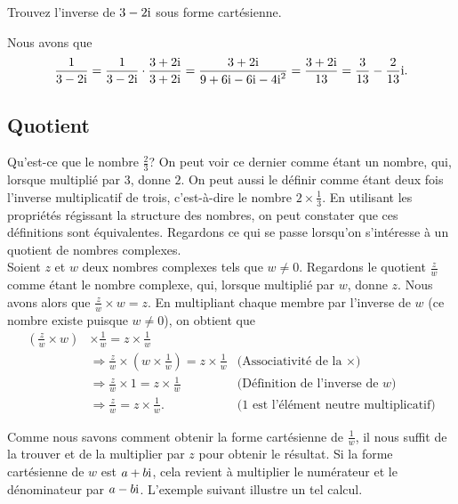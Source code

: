 \documentclass[
  letterpaper,
  DIV=11,
  numbers=noendperiod,
  oneside]{scrreprt}
\theoremstyle{definition}
\theoremstyle{remark}
\begin{document}
\begin{tcolorbox}[enhanced jigsaw, titlerule=0mm, colback=white, leftrule=.75mm, colframe=quarto-callout-note-color-frame, left=2mm, opacityback=0, toprule=.15mm, bottomrule=.15mm, breakable, title={Exemple}, coltitle=black, rightrule=.15mm, opacitybacktitle=0.6, bottomtitle=1mm, toptitle=1mm, arc=.35mm, colbacktitle=quarto-callout-note-color!10!white]

Trouvez l'inverse de \(3-2\textrm{i}\) sous forme cartésienne.

Nous avons que
\[\frac{1}{3-2\textrm{i}}=\frac{1}{3-2\textrm{i}}\cdot\frac{3+2\textrm{i}}{3+2\textrm{i}}=\frac{3+2\textrm{i}}{9+6\textrm{i}-6\textrm{i}-4\textrm{i}^2}=\frac{3+2\textrm{i}}{13}=\frac{3}{13}-\frac{2}{13}\textrm{i}.\]

\end{tcolorbox}

\hypertarget{quotient}{%
\subsection{Quotient}\label{quotient}}

Qu'est-ce que le nombre \(\frac{2}{3}\)? On peut voir ce dernier comme
étant un nombre, qui, lorsque multiplié par \(3\), donne \(2\). On peut
aussi le définir comme étant deux fois l'inverse multiplicatif de trois,
c'est-à-dire le nombre \(2\times \frac{1}{3}\). En utilisant les
propriétés régissant la structure des nombres, on peut constater que ces
définitions sont équivalentes. Regardons ce qui se passe lorsqu'on
s'intéresse à un quotient de nombres complexes.\\
Soient \(z\) et \(w\) deux nombres complexes tels que \(w\neq 0\).
Regardons le quotient \(\frac{z}{w}\) comme étant le nombre complexe,
qui, lorsque multiplié par \(w\), donne \(z\). Nous avons alors que
\(\frac{z}{w}\times w=z\). En multipliant chaque membre par l'inverse de
\(w\) (ce nombre existe puisque \(w\neq 0\)), on obtient que
\begin{align*}
\left(\frac{z}{w}\times w\right)&\times \frac{1}{w}=z\times\frac{1}{w}&\\
&\Rightarrow\frac{z}{w}\times \left(w\times \frac{1}{w}\right)=z\times\frac{1}{w}&\text{(Associativité de la $\times$)}\\
&\Rightarrow\frac{z}{w}\times 1=z\times\frac{1}{w}&\text{(Définition de l'inverse de $w$)}\\
&\Rightarrow\frac{z}{w}=z\times\frac{1}{w}.&\text{($1$ est l'élément neutre multiplicatif)}
\end{align*}

Comme nous savons comment obtenir la forme cartésienne de
\(\frac{1}{w}\), il nous suffit de la trouver et de la multiplier par
\(z\) pour obtenir le résultat. Si la forme cartésienne de \(w\) est
\(a+b\textrm{i}\), cela revient à multiplier le numérateur et le dénominateur
par \(a-b\textrm{i}\). L'exemple suivant illustre un tel calcul.
\end{document}
